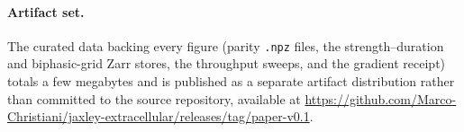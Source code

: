 \paragraph{Artifact set.} The curated data backing every figure
(parity \texttt{.npz} files, the strength--duration and biphasic-grid
Zarr stores, the throughput sweeps, and the gradient receipt) totals
a few megabytes and is published as a separate artifact distribution
rather than committed to the source repository, available
at \url{https://github.com/Marco-Christiani/jaxley-extracellular/releases/tag/paper-v0.1}.
